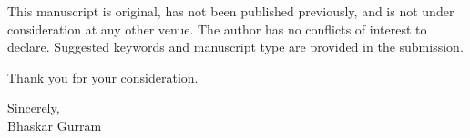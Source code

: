 \documentclass[11pt]{article}
\begin{document}
This manuscript is original, has not been published previously, and is not
under consideration at any other venue. The author has no conflicts of interest
to declare. Suggested keywords and manuscript type are provided in the
submission.

\vspace{0.5em}
\noindent Thank you for your consideration.

\vspace{1em}
\noindent Sincerely,\\
Bhaskar Gurram
\end{document}
